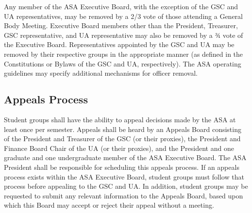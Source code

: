 \documentclass[12pt]{article}
\begin{document}
Any member of the ASA Executive Board, with the exception of the GSC and UA representatives, may be removed by a 2/3 vote of those attending a General Body Meeting. Executive Board members other than the President, Treasurer, GSC representative, and UA representative may also be removed by a ¾ vote of the Executive Board. Representatives appointed by the GSC and UA may be removed by their respective groups in the appropriate manner (as defined in the Constitutions or Bylaws of the GSC and UA, respectively). The ASA operating guidelines may specify additional mechanisms for officer removal.

\subsection{Appeals Process}

Student groups shall have the ability to appeal decisions made by the ASA at least once per semester. Appeals shall be heard by an Appeals Board consisting of the President and Treasurer of the GSC (or their proxies), the President and Finance Board Chair of the UA (or their proxies), and the President and one graduate and one undergraduate member of the ASA Executive Board. The ASA President shall be responsible for scheduling this appeals process. If an appeals process exists within the ASA Executive Board, student groups must follow that process before appealing to the GSC and UA. In addition, student groups may be requested to submit any relevant information to the Appeals Board, based upon which this Board may accept or reject their appeal without a meeting.
\end{document}
